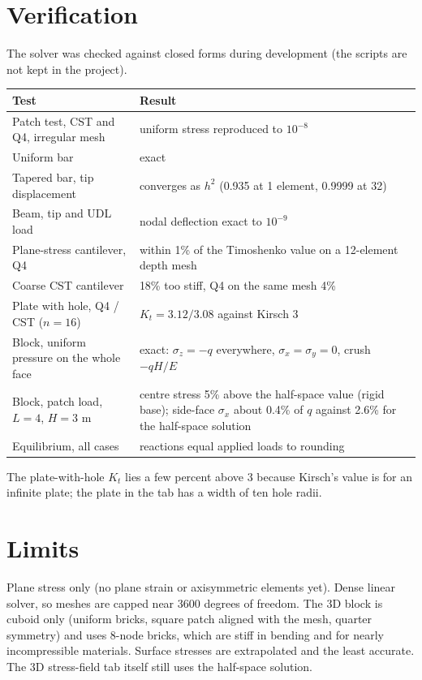 \documentclass[11pt,a4paper]{article}
\begin{document}
\section{Verification}
The solver was checked against closed forms during development (the scripts are not kept in the project).
\begin{center}\small
\begin{tabular}{@{}lp{7.5cm}@{}}\toprule
Test & Result\\\midrule
Patch test, CST and Q4, irregular mesh & uniform stress reproduced to $10^{-8}$\\
Uniform bar & exact\\
Tapered bar, tip displacement & converges as $h^2$ (0.935 at 1 element, 0.9999 at 32)\\
Beam, tip and UDL load & nodal deflection exact to $10^{-9}$\\
Plane-stress cantilever, Q4 & within 1\% of the Timoshenko value on a 12-element depth mesh\\
Coarse CST cantilever & 18\% too stiff, Q4 on the same mesh 4\%\\
Plate with hole, Q4 / CST ($n=16$) & $K_t=3.12/3.08$ against Kirsch 3\\
Block, uniform pressure on the whole face & exact: $\sigma_z=-q$ everywhere, $\sigma_x=\sigma_y=0$, crush $-qH/E$\\
Block, patch load, $L=4$, $H=3$ m & centre stress 5\% above the half-space value (rigid base); side-face $\sigma_x$ about 0.4\% of $q$ against 2.6\% for the half-space solution\\
Equilibrium, all cases & reactions equal applied loads to rounding\\\bottomrule
\end{tabular}
\end{center}
The plate-with-hole $K_t$ lies a few percent above 3 because Kirsch's value is for an infinite plate; the plate in the tab has a width of ten hole radii.

\section{Limits}
Plane stress only (no plane strain or axisymmetric elements yet). Dense linear solver, so meshes are capped near 3600 degrees of freedom. The 3D block is cuboid only (uniform bricks, square patch aligned with the mesh, quarter symmetry) and uses 8-node bricks, which are stiff in bending and for nearly incompressible materials. Surface stresses are extrapolated and the least accurate. The 3D stress-field tab itself still uses the half-space solution.
\end{document}

